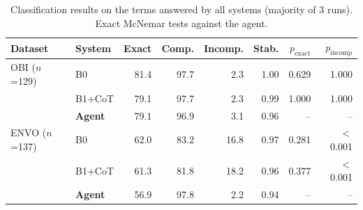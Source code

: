 \begin{table}[t]
\centering
\caption{Classification results on the terms answered by all systems (majority of 3 runs). Exact McNemar tests against the agent.}
\label{tab:main}
\small
\begin{tabular}{llrrrrrr}
\toprule
Dataset & System & Exact & Comp. & Incomp. & Stab. & $p_{\text{exact}}$ & $p_{\text{incomp}}$ \\
\midrule
OBI ($n$=129) & B0 & 81.4 & 97.7 & 2.3 & 1.00 & 0.629 & 1.000 \\
 & B1+CoT & 79.1 & 97.7 & 2.3 & 0.99 & 1.000 & 1.000 \\
 & \textbf{Agent} & 79.1 & 96.9 & 3.1 & 0.96 & -- & -- \\
\midrule
ENVO ($n$=137) & B0 & 62.0 & 83.2 & 16.8 & 0.97 & 0.281 & $<$0.001 \\
 & B1+CoT & 61.3 & 81.8 & 18.2 & 0.96 & 0.377 & $<$0.001 \\
 & \textbf{Agent} & 56.9 & 97.8 & 2.2 & 0.94 & -- & -- \\
\bottomrule
\end{tabular}
\end{table}
